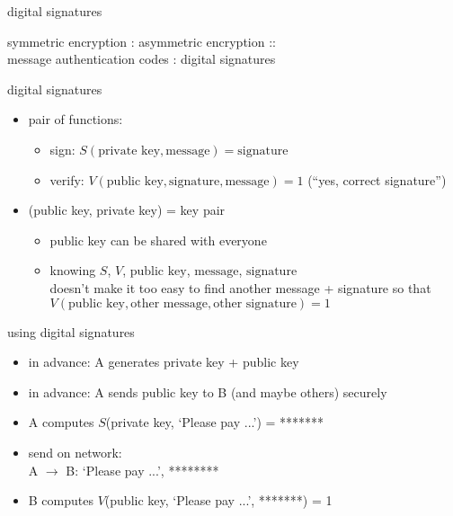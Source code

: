 \begin{frame}{digital signatures}

symmetric encryption : asymmetric encryption :: \\
message authentication codes : digital signatures
\end{frame}

\begin{frame}{digital signatures}
    \begin{itemize}
    \item pair of functions:
        \begin{itemize}
        \item sign: $S(\text{private key}, \text{message}) = \text{signature}$
        \item verify: $V(\text{public key}, \text{signature}, \text{message}) = 1$ (``yes, correct signature'')
        \end{itemize}
    \item (public key, private key) = key pair
        \begin{itemize}
        \item public key can be shared with everyone
        \item knowing $S$, $V$, $\text{public key}$, $\text{message}$, $\text{signature}$ \\
            doesn't make it too easy to find another message + signature so that\\
            $V(\text{public key}, \text{other message}, \text{other signature}) = 1$
        \end{itemize}
    \end{itemize}
\end{frame}

\begin{frame}{using digital signatures}
    \begin{itemize}
    \item in advance: A generates private key + public key
    \item in advance: A sends public key to B (and maybe others) securely
    \vspace{.5cm}
    \item A computes $S$(private key, `Please pay ...') = *******
    \item send on network: \\
    A $\rightarrow$ B: `Please pay ...', ********
    \item B computes $V$(public key, `Please pay ...', *******) = 1
    \end{itemize}
\end{frame}
